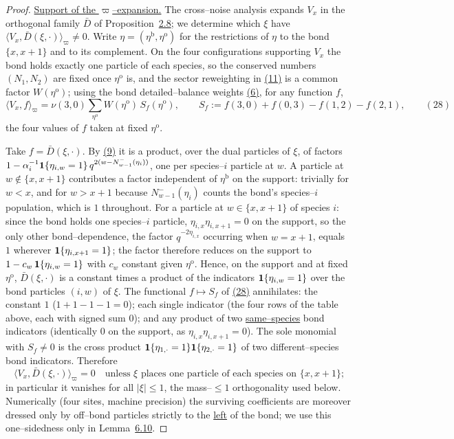 \documentclass[11pt]{article}
\theoremstyle{plain}
\theoremstyle{definition}
\theoremstyle{remark}
\begin{document}
\begin{proof}
\underline{Support of the $\varpi$--expansion.} The cross--noise analysis expands $V_x$ in the
orthogonal family $\bar D$ of Proposition~\hyperref[prop_orth]{2.8}; we determine which $\xi$ have
$\langle V_x,\bar D(\xi,\cdot)\rangle_\varpi\ne0$. Write
$\eta=(\eta^{\mathrm b},\eta^{\mathrm o})$ for the restrictions of $\eta$ to the bond
$\{x,x+1\}$ and to its complement. On the four configurations supporting $V_x$ the bond
holds exactly one particle of each species, so the conserved numbers $(N_1,N_2)$ are
fixed once $\eta^{\mathrm o}$ is, and the sector reweighting in \hyperref[eq_omegadef]{(11)} is a
common factor $W(\eta^{\mathrm o})$; using the bond detailed--balance weights
\hyperref[eq_dbrel]{(6)}, for any function $f$,
\label{eq_Vorthid}
\begin{equation}
  \langle V_x,f\rangle_\varpi=\nu(3,0)\sum_{\eta^{\mathrm o}}W(\eta^{\mathrm o})\,
  S_f(\eta^{\mathrm o}),\qquad
  S_f:=f(3,0)+f(0,3)-f(1,2)-f(2,1),\qquad(28)
\end{equation}
the four values of $f$ taken at fixed $\eta^{\mathrm o}$.

Take $f=\bar D(\xi,\cdot)$. By \hyperref[eq_Dreu]{(9)} it is a product, over the dual particles of
$\xi$, of factors $1-\alpha_i^{-1}\mathbf 1\{\eta_{i,w}=1\}\,q^{2(w-N^-_{w-1}(\eta_i))}$, one
per species--$i$ particle at $w$. A particle at $w\notin\{x,x+1\}$ contributes a factor
independent of $\eta^{\mathrm b}$ on the support: trivially for $w<x$, and for $w>x+1$
because $N^-_{w-1}(\eta_i)$ counts the bond's species--$i$ population, which is $1$
throughout. For a particle at $w\in\{x,x+1\}$ of species $i$: since the bond holds one
species--$i$ particle, $\eta_{i,x}\eta_{i,x+1}=0$ on the support, so the only other
bond--dependence, the factor $q^{-2\eta_{i,x}}$ occurring when $w=x+1$, equals $1$
wherever $\mathbf 1\{\eta_{i,x+1}=1\}$; the factor therefore reduces on the support to
$1-c_w\,\mathbf 1\{\eta_{i,w}=1\}$ with $c_w$ constant given $\eta^{\mathrm o}$. Hence, on the
support and at fixed $\eta^{\mathrm o}$, $\bar D(\xi,\cdot)$ is a constant times a product
of the indicators $\mathbf 1\{\eta_{i,w}=1\}$ over the bond particles $(i,w)$ of $\xi$.
The functional $f\mapsto S_f$ of \hyperref[eq_Vorthid]{(28)} annihilates: the constant $1$
($1+1-1-1=0$); each single indicator (the four rows of the table above, each with signed
sum $0$); and any product of two \underline{same--species} bond indicators (identically $0$ on
the support, as $\eta_{i,x}\eta_{i,x+1}=0$). The sole monomial with $S_f\ne0$ is the
cross product $\mathbf 1\{\eta_{1,\cdot}=1\}\mathbf 1\{\eta_{2,\cdot}=1\}$ of two
different--species bond indicators. Therefore
\[
  \langle V_x,\bar D(\xi,\cdot)\rangle_\varpi=0
  \quad\text{unless $\xi$ places one particle of each species on $\{x,x+1\}$;}
\]
in particular it vanishes for all $|\xi|\le1$, the mass--$\le1$ orthogonality used below.
Numerically (four sites, machine precision) the surviving coefficients are moreover
dressed only by off--bond particles strictly to the \underline{left} of the bond; we use this
one--sidedness only in Lemma~\hyperref[lem_eps]{6.10}.
\end{proof}
\end{document}
